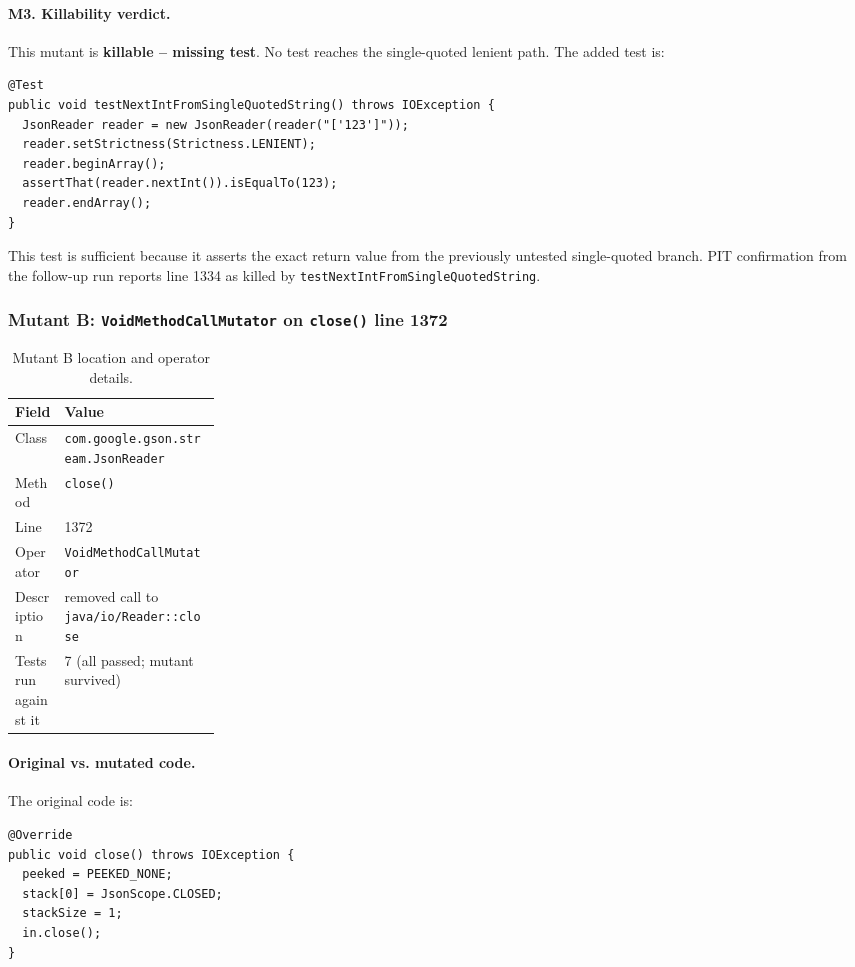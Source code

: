 \documentclass[11pt]{article}
\begin{document}
\paragraph{M3. Killability verdict.}
This mutant is \textbf{killable -- missing test}. No test reaches the single-quoted lenient path. The added test is:
\begin{lstlisting}[basicstyle=\ttfamily\small,breaklines=true]
@Test
public void testNextIntFromSingleQuotedString() throws IOException {
  JsonReader reader = new JsonReader(reader("['123']"));
  reader.setStrictness(Strictness.LENIENT);
  reader.beginArray();
  assertThat(reader.nextInt()).isEqualTo(123);
  reader.endArray();
}
\end{lstlisting}

This test is sufficient because it asserts the exact return value from the previously untested single-quoted branch. PIT confirmation from the follow-up run reports line 1334 as killed by \texttt{testNextIntFromSingleQuotedString}.

\subsubsection{Mutant B: \texttt{VoidMethodCallMutator} on \texttt{close()} line 1372}
\begin{table}[H]
\centering
\small
\begin{tabularx}{\linewidth}{>{\raggedright\arraybackslash}p{0.24\linewidth}X}
\toprule
Field & Value \\
\midrule
Class & \texttt{com.google.gson.stream.JsonReader} \\
Method & \texttt{close()} \\
Line & 1372 \\
Operator & \texttt{VoidMethodCallMutator} \\
Description & removed call to \texttt{java/io/Reader::close} \\
Tests run against it & 7 (all passed; mutant survived) \\
\bottomrule
\end{tabularx}
\caption{Mutant B location and operator details.}
\end{table}

\paragraph{Original vs. mutated code.}
The original code is:
\begin{lstlisting}[basicstyle=\ttfamily\small,breaklines=true]
@Override
public void close() throws IOException {
  peeked = PEEKED_NONE;
  stack[0] = JsonScope.CLOSED;
  stackSize = 1;
  in.close();
}
\end{lstlisting}
\end{document}
